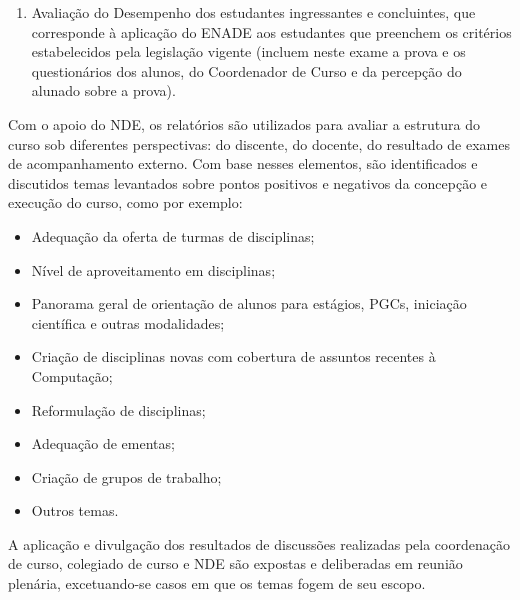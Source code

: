 \begin{enumerate}
    \item Avaliação do Desempenho dos estudantes ingressantes e concluintes,
    que corresponde à aplicação do ENADE aos estudantes que preenchem os
    critérios estabelecidos pela legislação vigente (incluem neste exame a
    prova e os questionários dos alunos, do Coordenador de Curso e da percepção
    do alunado sobre a prova).
\end{enumerate}

Com o apoio do NDE, os relatórios são utilizados para avaliar a estrutura do
curso sob diferentes perspectivas: do discente, do docente, do resultado de
exames de acompanhamento externo. 
Com base nesses elementos, são identificados e discutidos temas levantados
sobre pontos positivos e negativos da concepção e execução do curso, como por
exemplo:
\begin{itemize}
    \item Adequação da oferta de turmas de disciplinas;
    \item Nível de aproveitamento em disciplinas;
    \item Panorama geral de orientação de alunos para estágios, PGCs, iniciação
    científica e outras modalidades;
    \item Criação de disciplinas novas com cobertura de assuntos recentes à
    Computação;
    \item Reformulação de disciplinas;
    \item Adequação de ementas;
    \item Criação de grupos de trabalho;
    \item Outros temas.
\end{itemize}

A aplicação e divulgação dos resultados de discussões realizadas pela
coordenação de curso, colegiado de curso e NDE são expostas e deliberadas em
reunião plenária, excetuando-se casos em que os temas fogem de seu escopo.
